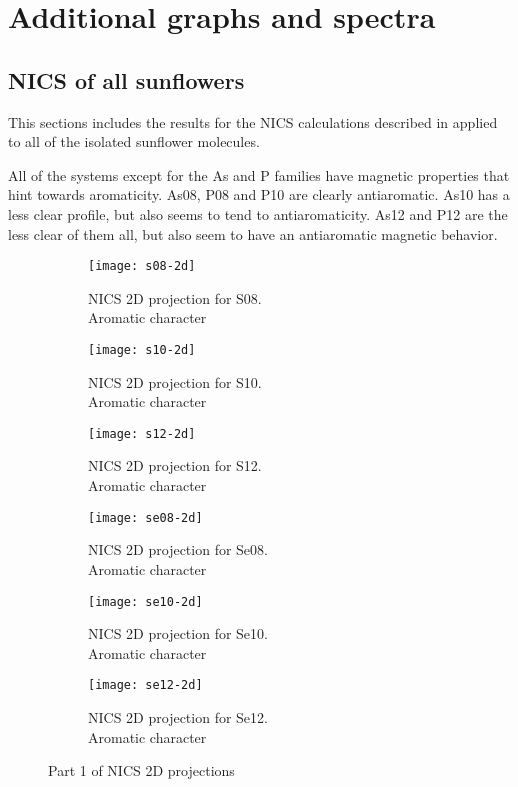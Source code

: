 \chapter{Additional graphs and spectra}

\newpage
\section{NICS of all sunflowers}
This sections includes the results for the NICS calculations described in  applied to all of the isolated sunflower molecules.

All of the systems except for the As and P families have magnetic properties that hint towards aromaticity.
As08, P08 and P10 are clearly antiaromatic.
As10 has a less clear profile, but also seems to tend to antiaromaticity.
As12 and P12 are the less clear of them all, but also seem to have an antiaromatic magnetic behavior.

\begin{figure*}[h]
\centering
\begin{subfigure}{5.5cm}\centering\texttt{[image: s08-2d]}\caption{NICS 2D projection for S08.\\Aromatic character}\end{subfigure}%
\begin{subfigure}{5.5cm}\centering\texttt{[image: s10-2d]}\caption{NICS 2D projection for S10.\\Aromatic character}\end{subfigure}%
\begin{subfigure}{5.5cm}\centering\texttt{[image: s12-2d]}\caption{NICS 2D projection for S12.\\Aromatic character}\end{subfigure}
\begin{subfigure}{5.5cm}\centering\texttt{[image: se08-2d]}\caption{NICS 2D projection for Se08.\\Aromatic character}\end{subfigure}%
\begin{subfigure}{5.5cm}\centering\texttt{[image: se10-2d]}\caption{NICS 2D projection for Se10.\\Aromatic character}\end{subfigure}%
\begin{subfigure}{5.5cm}\centering\texttt{[image: se12-2d]}\caption{NICS 2D projection for Se12.\\Aromatic character}\end{subfigure}
\caption[Part 1 of NICS 2D projections]{Part 1 of NICS 2D projections}
\end{figure*}

